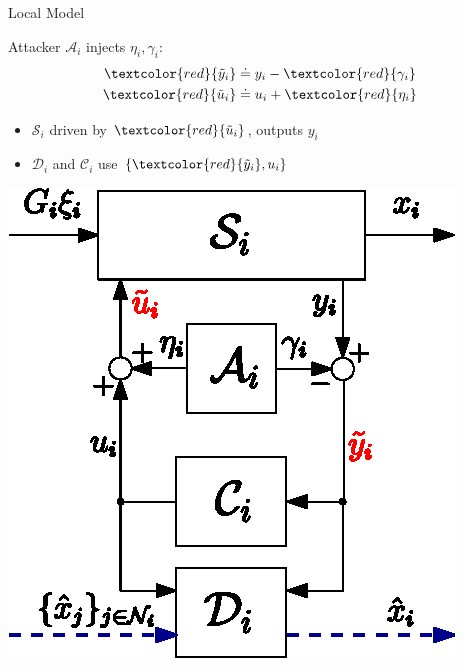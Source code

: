 \documentclass[presentation]{beamer}
\begin{document}
\begin{frame}{Local Model}
\begin{minipage}[c]{0.51\linewidth}
Attacker $\mathcal A_i$ injects $\eta_i, \gamma_i$:
\begin{equation*}
    \begin{aligned}
    	\textcolor{red}{\tilde y_i} &\doteq y_i - \textcolor{red}{\gamma_i}  \\
        \textcolor{red}{\tilde u_i} &\doteq u_i + \textcolor{red}{\eta_i}
    \end{aligned}
\end{equation*}
\begin{itemize}
    \item $\mathcal S_i$ driven by $\textcolor{red}{\tilde u_i}$, outputs $y_i$
    \item $\mathcal D_i$ and $\mathcal C_i$ use $\{\textcolor{red}{\tilde y_i}, u_i\}$
\end{itemize}
\end{minipage}%
\begin{minipage}[c]{0.48\linewidth}
    \centering
    \includegraphics[scale=.7]{fig/cdc19-subsys.eps}
\end{minipage}
\end{frame}
\end{document}
